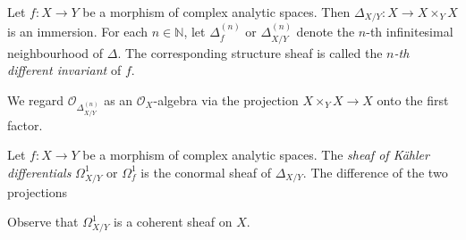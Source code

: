 \begin{definition}
    Let $f:X\rightarrow Y$ be a morphism of complex analytic spaces. Then $\Delta_{X/Y}:X\rightarrow X\times_Y X$ is an immersion. For each $n\in \mathbb{N}$, let $\Delta_f^{(n)}$ or $\Delta_{X/Y}^{(n)}$ denote the $n$-th infinitesimal neighbourhood of $\Delta$. The corresponding structure sheaf is called the \emph{$n$-th different invariant} of $f$.
\end{definition}
We regard $\mathcal{O}_{\Delta_{X/Y}^{(n)}}$ as an $\mathcal{O}_X$-algebra via the projection $X\times_Y X\rightarrow X$ onto the first factor. 

\begin{definition}
    Let $f:X\rightarrow Y$ be a morphism of complex analytic spaces. The \emph{sheaf of Kähler differentials} $\Omega^1_{X/Y}$ or $\Omega^1_{f}$ is the conormal sheaf of $\Delta_{X/Y}$. The difference of the two projections 
\end{definition}
Observe that $\Omega^1_{X/Y}$ is a coherent sheaf on $X$.

\fi

\printbibliography
